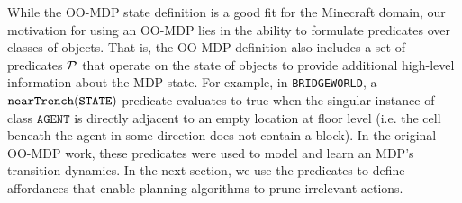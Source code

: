 \documentclass[]{article}
\newcommand{\stnote}[1]{\textcolor{Blue}{\textbf{ST: #1}}}
\newcommand{\dnote}[1]{\textcolor{Orange}{\textbf{D: #1}}}
\begin{document}

While the OO-MDP state definition is a good fit for the Minecraft
domain, our motivation for using an OO-MDP lies in the ability to
formulate predicates over classes of objects. That is, the OO-MDP
definition also includes a set of predicates ${\cal P}$ that operate
on the state of objects to provide additional high-level information
about the MDP state. For example, in \texttt{BRIDGEWORLD}, a ${\tt
  nearTrench}({\tt STATE})$ predicate evaluates to true when the singular
instance of class $\texttt{AGENT}$ is directly adjacent to an empty location
at floor level (i.e. the cell beneath the agent in some direction does not
contain a block). In the original OO-MDP work, these predicates were used
to model and learn an MDP's transition dynamics. In the next section,
we use the predicates to define affordances that enable planning
algorithms to prune irrelevant actions.



\end{document}
